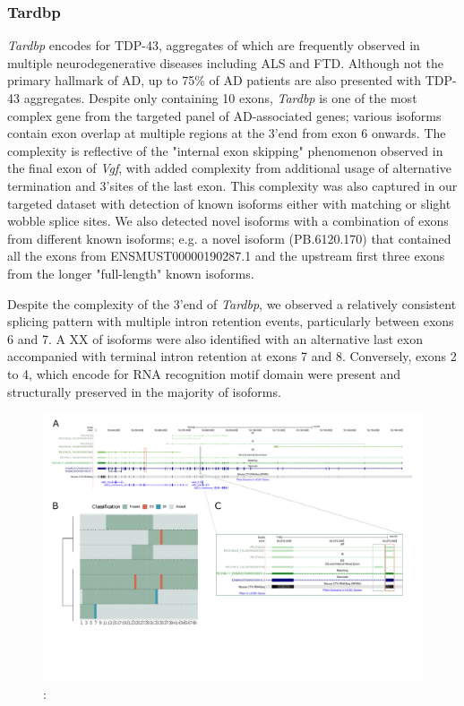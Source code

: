 \subsubsection{Tardbp}
\textit{Tardbp} encodes for TDP-43, aggregates of which are frequently observed in multiple neurodegenerative diseases including ALS and FTD. Although not the primary hallmark of AD, up to 75\% of AD patients are also presented with TDP-43 aggregates. Despite only containing 10 exons, \textit{Tardbp} is one of the most complex gene from the targeted panel of AD-associated genes; various isoforms contain exon overlap at multiple regions at the 3'end from exon 6 onwards. The complexity is reflective of the "internal exon skipping" phenomenon observed in the final exon of \textit{Vgf}, with added complexity from additional usage of alternative termination and 3'sites of the last exon. This complexity was also captured in our targeted dataset with detection of known isoforms either with matching or slight wobble splice sites. We also detected novel isoforms with a combination of exons from different known isoforms; e.g. a novel isoform (PB.6120.170) that contained all the exons from ENSMUST00000190287.1 and the upstream first three exons from the longer "full-length" known isoforms. 

Despite the complexity of the 3'end of \textit{Tardbp}, we observed a relatively consistent splicing pattern with multiple intron retention events, particularly between exons 6 and 7. A XX of isoforms were also identified with an alternative last exon accompanied with terminal intron retention at exons 7 and 8. Conversely, exons 2 to 4, which encode for RNA recognition motif domain were present and structurally preserved in the majority of isoforms.  

\begin{landscape}
	\begin{figure}[htp]
		\begin{center}
			\includegraphics[page=11,trim={0 1cm 0 0},scale = 0.85]{Figures/TargetGenes_Annotation_Landscape.pdf}
		\end{center}
		\captionsetup{width=0.95\textwidth}
		\caption[RNA-Seq defined transcriptome]%
		{\textbf{}: }   
		\label{fig:tardbp}
	\end{figure}
\end{landscape} 

